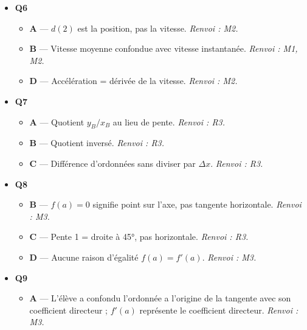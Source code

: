 \begin{itemize}
  \begin{itemize}
    \item \textbf{A} — L'élève a developpe incompletement $(2+h)^2$ en $4+h^2$ puis a donne $f(2+h)$ sans former le taux $[f(2+h)-f(2)]/h$. \emph{Renvoi : R2.}
    \item \textbf{C} — L'élève a donne la valeur $f(2)=4$ au lieu de calculer le taux d'accroissement, qui vaut $4+h$. \emph{Renvoi : R2.}
    \item \textbf{D} — Produit $4h$ au lieu de somme $4+h$. \emph{Renvoi : R2.}
  \end{itemize}
  \item \textbf{Q6}
  \begin{itemize}
    \item \textbf{A} — $d(2)$ est la position, pas la vitesse. \emph{Renvoi : M2.}
    \item \textbf{B} — Vitesse moyenne confondue avec vitesse instantanée. \emph{Renvoi : M1, M2.}
    \item \textbf{D} — Accélération = dérivée de la vitesse. \emph{Renvoi : M2.}
  \end{itemize}
  \item \textbf{Q7}
  \begin{itemize}
    \item \textbf{A} — Quotient $y_B/x_B$ au lieu de pente. \emph{Renvoi : R3.}
    \item \textbf{B} — Quotient inversé. \emph{Renvoi : R3.}
    \item \textbf{C} — Différence d'ordonnées sans diviser par $\Delta x$. \emph{Renvoi : R3.}
  \end{itemize}
  \item \textbf{Q8}
  \begin{itemize}
    \item \textbf{B} — $f(a)=0$ signifie point sur l'axe, pas tangente horizontale. \emph{Renvoi : M3.}
    \item \textbf{C} — Pente 1 = droite à 45°, pas horizontale. \emph{Renvoi : R3.}
    \item \textbf{D} — Aucune raison d'égalité $f(a) = f'(a)$. \emph{Renvoi : M3.}
  \end{itemize}
  \item \textbf{Q9}
  \begin{itemize}
    \item \textbf{A} — L'élève a confondu l'ordonnée a l'origine de la tangente avec son coefficient directeur ; $f'(a)$ représente le coefficient directeur. \emph{Renvoi : M3.}

\end{itemize}
\end{itemize}
